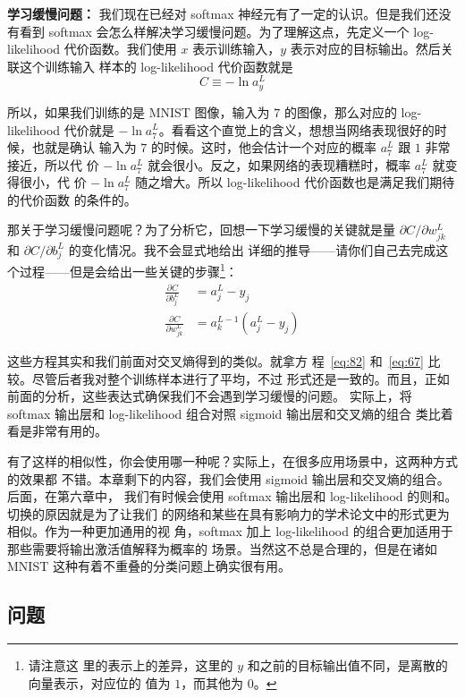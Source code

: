 \textbf{学习缓慢问题：} 我们现在已经对 softmax 神经元有了一定的认识。但是我们还没
有看到 softmax 会怎么样解决学习缓慢问题。为了理解这点，先定义一个 log-likelihood
代价函数。我们使用 $x$ 表示训练输入，$y$ 表示对应的目标输出。然后关联这个训练输入
样本的 log-likelihood 代价函数就是
\begin{equation}
  C \equiv -\ln a^L_y
  \label{eq:80}\tag{80}
\end{equation}

所以，如果我们训练的是 MNIST 图像，输入为 $7$ 的图像，那么对应的 log-likelihood
代价就是 $-\ln a_7^L$。看看这个直觉上的含义，想想当网络表现很好的时候，也就是确认
输入为 $7$ 的时候。这时，他会估计一个对应的概率 $a_7^L$ 跟 $1$ 非常接近，所以代
价 $-\ln a_7^L$ 就会很小。反之，如果网络的表现糟糕时，概率 $a_7^L$ 就变得很小，代
价 $-\ln a_7^L$ 随之增大。所以 log-likelihood 代价函数也是满足我们期待的代价函数
的条件的。

那关于学习缓慢问题呢？为了分析它，回想一下学习缓慢的关键就是量 $\partial
C/\partial w_{jk}^L$ 和 $\partial C/\partial b_j^L$ 的变化情况。我不会显式地给出
详细的推导——请你们自己去完成这个过程——但是会给出一些关键的步骤\footnote{请注意这
  里的表示上的差异，这里的 $y$ 和之前的目标输出值不同，是离散的向量表示，对应位的
  值为 $1$，而其他为 $0$。}：
\begin{align}
  \frac{\partial C}{\partial b^L_j} &= a^L_j-y_j \label{eq:81}\tag{81}\\
  \frac{\partial C}{\partial w^L_{jk}} &= a^{L-1}_k (a^L_j-y_j) \label{eq:82}\tag{82}
\end{align}

这些方程其实和我们前面对交叉熵得到的类似。就拿方
程~\eqref{eq:82} 和~\eqref{eq:67} 比较。尽管后者我对整个训练样本进行了平均，不过
形式还是一致的。而且，正如前面的分析，这些表达式确保我们不会遇到学习缓慢的问题。
实际上，将 softmax 输出层和 log-likelihood 组合对照 sigmoid 输出层和交叉熵的组合
类比着看是非常有用的。

有了这样的相似性，你会使用哪一种呢？实际上，在很多应用场景中，这两种方式的效果都
不错。本章剩下的内容，我们会使用 sigmoid 输出层和交叉熵的组合。后面，在第六章中，
我们有时候会使用 softmax 输出层和 log-likelihood 的则和。切换的原因就是为了让我们
的网络和某些在具有影响力的学术论文中的形式更为相似。作为一种更加通用的视
角，softmax 加上 log-likelihood 的组合更加适用于那些需要将输出激活值解释为概率的
场景。当然这不总是合理的，但是在诸如 MNIST 这种有着不重叠的分类问题上确实很有用。

\subsection*{问题}


